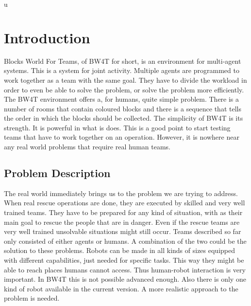u\documentclass{article}
\begin{document}
\section{Introduction}

Blocks World For Teams, of BW4T for short, is an environment for multi-agent systems. This is a system for joint activity. Multiple agents are programmed to work together as a team with the same goal. They have to divide the workload in order to even be able to solve the problem, or solve the problem more efficiently. The BW4T environment offers a, for humans, quite simple problem. There is a number of rooms that contain coloured blocks and there is a sequence that tells the order in which the blocks should be collected. The simplicity of BW4T is its strength. It is powerful in what is does. This is a good point to start testing teams that have to work together on an operation. However, it is nowhere near any real world problems that require real human teams. 

\subsection{Problem Description}
The real world immediately brings us to the problem we are trying to address. When real rescue operations are done, they are executed by skilled and very well trained teams. They have to be prepared for any kind of situation, with as their main goal to rescue the people that are in danger. Even if the rescue teams are very well trained unsolvable situations might still occur. Teams described so far only consisted of either agents or humans. A combination of the two could be the solution to these problems. Robots can be made in all kinds of sizes equipped with different capabilities, just needed for specific tasks. This way they might be able to reach places humans cannot access. Thus human-robot interaction is very important. In BW4T this is not possible advanced enough. Also there is only one kind of robot available in the current version. A more realistic approach to the problem is needed.
\end{document}
